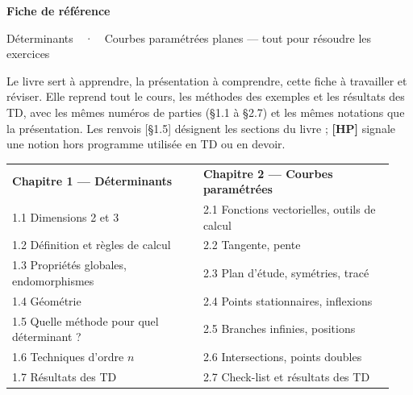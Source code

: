 \documentclass[a4paper,10pt]{article}
\newcommand{\HP}{{\sffamily\bfseries\scriptsize\textcolor{Brique}{[HP]}}}
\newcommand{\livre}[1]{{\sffamily\scriptsize\color{Gris}[#1]}}
\begin{document}
\thispagestyle{empty}
\noindent\colorbox{Bleu}{\parbox{\dimexpr\linewidth-2\fboxsep}{\vspace{0.4em}
{\color{white}\sffamily\scriptsize{}}\par\smallskip
{\color{white}\sffamily\bfseries\LARGE Fiche de référence}\par\smallskip
{\color{white!85!Bleu}\sffamily Déterminants\ \ ·\ \ Courbes paramétrées planes --- tout pour résoudre les exercices}\vspace{0.4em}}}

\vspace{0.6em}
{\small Le livre sert à apprendre, la présentation à comprendre, cette fiche à travailler et réviser. Elle reprend tout le
cours, les méthodes des exemples et les résultats des TD, avec les mêmes numéros de parties (§1.1 à §2.7) et les mêmes notations
que la présentation. Les renvois \livre{§1.5} désignent les sections du livre ; \HP{} signale une notion hors
programme utilisée en TD ou en devoir.}

\vspace{0.4em}
{\small\sffamily
\begin{tabular}{@{}p{0.47\linewidth}p{0.47\linewidth}@{}}
\textbf{\color{Bleu}Chapitre 1 --- Déterminants} & \textbf{\color{Bleu}Chapitre 2 --- Courbes paramétrées}\\[2pt]
1.1 Dimensions 2 et 3 \dotfill\pageref{n11} & 2.1 Fonctions vectorielles, outils de calcul \dotfill\pageref{n21}\\
1.2 Définition et règles de calcul \dotfill\pageref{n12} & 2.2 Tangente, pente \dotfill\pageref{n22}\\
1.3 Propriétés globales, endomorphismes \dotfill\pageref{n13} & 2.3 Plan d'étude, symétries, tracé \dotfill\pageref{n23}\\
1.4 Géométrie \dotfill\pageref{n14} & 2.4 Points stationnaires, inflexions \dotfill\pageref{n24}\\
1.5 Quelle méthode pour quel déterminant ? \dotfill\pageref{n15} & 2.5 Branches infinies, positions \dotfill\pageref{n25}\\
1.6 Techniques d'ordre $n$ \dotfill\pageref{n16} & 2.6 Intersections, points doubles \dotfill\pageref{n26}\\
1.7 Résultats des TD \dotfill\pageref{n17} & 2.7 Check-list et résultats des TD \dotfill\pageref{n27}\\
\end{tabular}}
\end{document}
